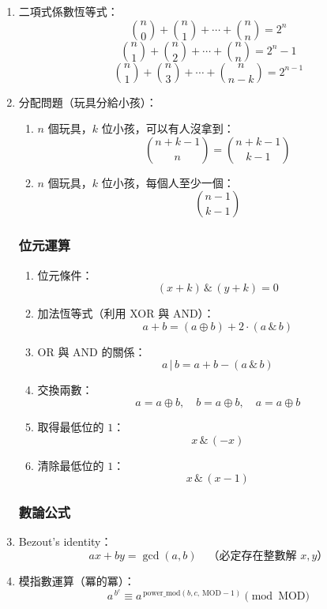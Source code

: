 \begin{enumerate}
\item 二項式係數恆等式：
\[
\binom{n}{0} + \binom{n}{1} + \cdots + \binom{n}{n} = 2^n
\]
\[
\binom{n}{1} + \binom{n}{2} + \cdots + \binom{n}{n} = 2^n - 1
\]
\[
\binom{n}{1} + \binom{n}{3} + \cdots + \binom{n}{n - k} = 2^{n - 1}
\]

\item 分配問題（玩具分給小孩）：
\begin{enumerate}\itemsep = -3pt
\item $n$ 個玩具，$k$ 位小孩，可以有人沒拿到：
\[
\binom{n+k-1}{n} = \binom{n+k-1}{k-1}
\]
\item $n$ 個玩具，$k$ 位小孩，每個人至少一個：
\[
\binom{n-1}{k-1}
\]
\end{enumerate}

\subsubsection{位元運算}
\begin{enumerate}\itemsep = -3pt
\item 位元條件：
\[
(x + k) \,\&\, (y + k) = 0
\]

\item 加法恆等式（利用 XOR 與 AND）：
\[
a + b = (a \oplus b) + 2 \cdot (a \,\&\, b)
\]
\item OR 與 AND 的關係：
\[
a \,|\, b = a + b - (a \,\&\, b)
\]
\item 交換兩數：
\[
a = a \oplus b, \quad b = a \oplus b, \quad a = a \oplus b
\]
\item 取得最低位的 $1$：
\[x \,\&\, (-x)
\]
\item 清除最低位的 $1$：
\[x \,\&\, (x - 1)
\]
\end{enumerate}

\subsubsection{數論公式}
\item Bezout's identity：
\[
ax + by = \gcd(a, b) \quad \text{（必定存在整數解 $x, y$）}
\]

\item 模指數運算（冪的冪）：
\[
a^{\,b^c} \equiv a^{\,\text{power\_mod}(b, c, \, \text{MOD}-1)} \pmod{\text{MOD}}
\]
\end{enumerate}


%